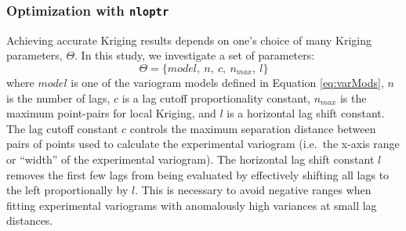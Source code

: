 \hypertarget{nloptr}{%
\subsubsection{\texorpdfstring{Optimization with \texttt{nloptr}}{Optimization with nloptr}}\label{nloptr}}

Achieving accurate Kriging results depends on one's choice of many Kriging parameters, \(\Theta\). In this study, we investigate a set of parameters:
\begin{equation} 
  \Theta = \{model,\ n,\ c,\ n_{max},\ l\}
  \label{eq:params}
\end{equation}
where \(model\) is one of the variogram models defined in Equation \eqref{eq:varMods}, \(n\) is the number of lags, \(c\) is a lag cutoff proportionality constant, \(n_{max}\) is the maximum point-pairs for local Kriging, and \(l\) is a horizontal lag shift constant. The lag cutoff constant \(c\) controls the maximum separation distance between pairs of points used to calculate the experimental variogram (i.e.~the x-axis range or ``width'' of the experimental variogram). The horizontal lag shift constant \(l\) removes the first few lags from being evaluated by effectively shifting all lags to the left proportionally by \(l\). This is necessary to avoid negative ranges when fitting experimental variograms with anomalously high variances at small lag distances.

